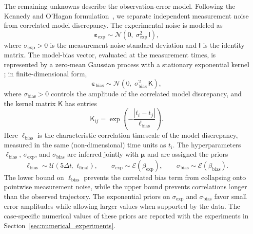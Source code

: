 \documentclass{elsarticle}
\renewcommand{\vec}[1]{\boldsymbol{#1}}
\newcommand{\mat}[1]{\mathsf{#1}}
\newcommand{\params}{\boldsymbol{\mu}}
\begin{document}
The remaining unknowns describe the observation-error model. Following
the Kennedy and O'Hagan formulation~\cite{kennedy2001calibration}, we
separate independent measurement noise from correlated model
discrepancy. The experimental noise is modeled as
\begin{equation}
\vec{\varepsilon}_{\mathrm{exp}}
\sim \mathcal{N}\!\left(0,\;\sigma_{\mathrm{exp}}^{2}\,\mat{I}\right),
\label{eq:exp_noise_prior}
\end{equation}
where $\sigma_{\mathrm{exp}} > 0$ is the measurement-noise standard
deviation and $\mat{I}$ is the identity matrix. The model-bias vector,
evaluated at the measurement times, is represented by a zero-mean
Gaussian process with a stationary exponential kernel
\cite{rasmussen2006gpml}; in finite-dimensional form,
\begin{equation}
\vec{\varepsilon}_{\mathrm{bias}}
\sim \mathcal{N}\!\left(0,\;\sigma_{\mathrm{bias}}^{2}\,\mat{K}\right),
\label{eq:bias_gp}
\end{equation}
where $\sigma_{\mathrm{bias}} > 0$ controls the amplitude of the
correlated model discrepancy, and the kernel matrix $\mat{K}$ has entries
\begin{equation}
\mat{K}_{ij}
= \exp\!\left(-\dfrac{|t_{i} - t_{j}|}{\ell_{\mathrm{bias}}}\right).
\label{eq:kernel}
\end{equation}
Here $\ell_{\mathrm{bias}}$ is the characteristic correlation timescale
of the model discrepancy, measured in the same (non-dimensional) time
units as $t_i$. The hyperparameters
$\ell_{\mathrm{bias}}$, $\sigma_{\mathrm{exp}}$, and
$\sigma_{\mathrm{bias}}$ are inferred jointly with $\params$ and are
assigned the priors
\begin{equation}
\ell_{\mathrm{bias}}
\sim \mathcal{U}\!\left(5\Delta t,\; t_{\mathrm{final}}\right),
\qquad
\sigma_{\mathrm{exp}}
\sim \mathcal{E}(\beta_{\mathrm{exp}}),
\qquad
\sigma_{\mathrm{bias}}
\sim \mathcal{E}(\beta_{\mathrm{bias}}).
\label{eq:priors_noise}
\end{equation}
The lower bound on $\ell_{\mathrm{bias}}$ prevents the correlated bias
term from collapsing onto pointwise measurement noise, while the upper
bound prevents correlations longer than the observed trajectory. The
exponential priors on $\sigma_{\mathrm{exp}}$ and
$\sigma_{\mathrm{bias}}$ favor small error amplitudes while allowing
larger values when supported by the data. The case-specific numerical
values of these priors are reported with the experiments in
Section~\ref{sec:numerical_experiments}.
\end{document}
